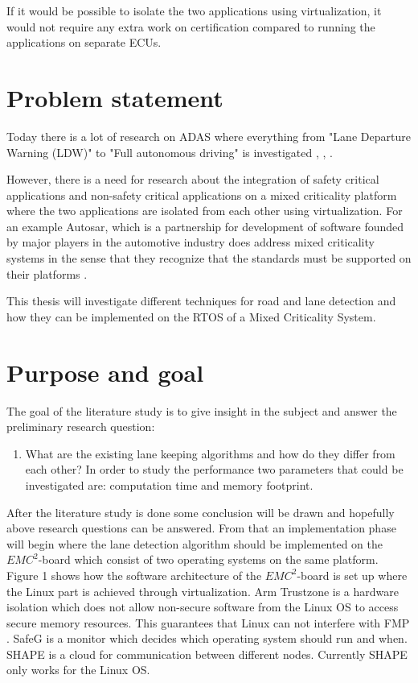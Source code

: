 If it would be possible to isolate the two applications using virtualization, it would not require any extra work on certification compared to running the applications on separate ECUs.

\section{Problem statement}
Today there is a lot of research on ADAS where everything from "Lane Departure Warning (LDW)" to "Full autonomous driving" is investigated \cite{BarHillel2014}, \cite{Yenikaya:2013:KVR:2522968.2522970}, \cite{mccall2006video}. 

However, there is a need for research about the integration of safety critical applications and non-safety critical applications on a mixed criticality platform where the two applications are isolated from each other using virtualization. For an example Autosar, which is a partnership for development of software founded by major players in the automotive industry does address mixed criticality systems in the sense that they recognize that the standards must be supported on their platforms \cite{burns2013mixed} \cite{auto}.

This thesis will investigate different techniques for road and lane detection and how they can be implemented on the RTOS of a Mixed Criticality System. 


\section{Purpose and goal}
The goal of the literature study is to give insight in the subject and answer the preliminary research question:
\begin{enumerate}  
\item What are the existing lane keeping algorithms and how do they differ from each other? In order to study the performance two parameters that could be investigated are: computation time and memory footprint.
\end{enumerate}

After the literature study is done some conclusion will be drawn and hopefully above research questions can be answered. From that an implementation phase will begin where the lane detection algorithm should be implemented on the $EMC^2$-board which consist of two operating systems on the same platform. Figure 1 shows how the software architecture of the $EMC^2$-board is set up where the Linux part is achieved through virtualization. Arm Trustzone is a hardware isolation which does not allow non-secure software from the Linux OS to access secure memory resources. This guarantees that Linux can not interfere with FMP \cite{zaki2016}. SafeG is a monitor which decides which operating system should run and when. SHAPE is a cloud for communication between different nodes. Currently SHAPE only works for the Linux OS.


